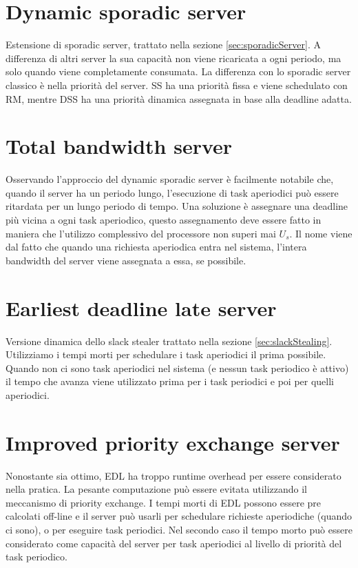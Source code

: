 \documentclass[12pt,openany,onesided]{book}
\begin{document}
\section{Dynamic sporadic server}
\label{sec:dynamicSporadicServer}
Estensione di sporadic server, trattato nella sezione \ref{sec:sporadicServer}. A differenza di altri server la sua capacità non viene ricaricata a ogni periodo, ma solo quando viene completamente consumata.
La differenza con lo sporadic server classico è nella priorità del server. SS ha una priorità fissa e viene schedulato con RM, mentre DSS ha una priorità dinamica assegnata in base alla deadline adatta.
\section{Total bandwidth server}
\label{sec:totalBandwidthServer}
Osservando l'approccio del dynamic sporadic server è facilmente notabile che, quando il server ha un periodo lungo, l'esecuzione di task aperiodici può essere ritardata per un lungo periodo di tempo.
Una soluzione è assegnare una deadline più vicina a ogni task aperiodico, questo assegnamento deve essere fatto in maniera che l'utilizzo complessivo del processore non superi mai $U_s$.
Il nome viene dal fatto che quando una richiesta aperiodica entra nel sistema, l'intera bandwidth del server viene assegnata a essa, se possibile.
\section{Earliest deadline late server}
\label{sec:earliestDeadlineLateServer}
Versione dinamica dello slack stealer trattato nella sezione \ref{sec:slackStealing}.
Utilizziamo i tempi morti per schedulare i task aperiodici il prima possibile.
Quando non ci sono task aperiodici nel sistema (e nessun task periodico è attivo) il tempo che avanza viene utilizzato prima per i task periodici e poi per quelli aperiodici.
\section{Improved priority exchange server}
Nonostante sia ottimo, EDL ha troppo runtime overhead per essere considerato nella pratica.
La pesante computazione può essere evitata utilizzando il meccanismo di priority exchange.
I tempi morti di EDL possono essere pre calcolati off-line e il server può usarli per schedulare richieste aperiodiche (quando ci sono), o per eseguire task periodici.
Nel secondo caso il tempo morto può essere considerato come capacità del server per task aperiodici al livello di priorità del task periodico.
\end{document}
